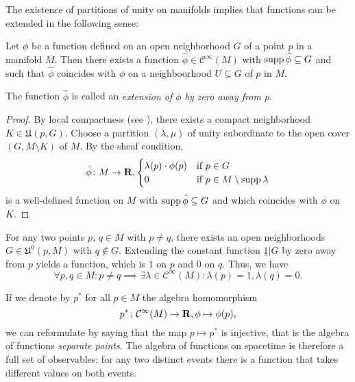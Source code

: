 The existence of partitions of unity on manifolds implies that functions can
be extended in the following sense:

\begin{cor}
  Let $\phi$ be a function defined on an open
  neighborhood $G$ of a point $p$
  in a manifold $M$. Then there exists a function $\widehat \phi \in \mathcal C^\infty(M)$
  with $\operatorname{supp} \widehat\phi \subseteq G$ and
  such that $\widehat \phi$ coincides with $\phi$ on a neighboorhood $U \subseteq G$
  of $p$ in $M$.
\end{cor}
The function $\widehat \phi$ is called an \emph{extension of $\phi$
by zero away from $p$}.

\begin{proof}
  By local compactness (see ),
  there exists a compact neighborhood $K \in \mathfrak U(p, G)$.
  Choose a partition $(\lambda, \mu)$ of unity subordinate to the open cover
  $(G, M \setminus K)$ of $M$. By the sheaf condition,
  \[
    \hat\phi\colon M \to \mathbf{R},
    \begin{cases}
      \lambda(p) \cdot \phi(p) & \text{if $p \in G$} \\
      0 & \text{if $p \in M \setminus \operatorname{supp} \lambda$}
    \end{cases}
  \]
  is a well-defined function on $M$ with $\operatorname{supp} \hat\phi \subseteq G$ and
  which coincides with $\phi$ on $K$.
\end{proof}

For any two points $p$, $q \in M$ with $p \neq q$, there exists an open
neighborhoods $G \in \mathfrak U^0(p, M)$ with $q \notin G$. Extending the
constant function $\underline 1|G$ by zero away from $p$ yields a function,
which is $1$ on $p$ and $0$ on $q$. Thus, we have
\begin{equation}
  \label{eq:point_separation}
  \forall p, q \in M : p \neq q \implies
  \exists \lambda \in \mathcal C^\infty(M) : \lambda(p) = 1, \lambda(q) = 0.
\end{equation}

If we denote by $p^*$ for all $p \in M$ the algebra homomorphism
\begin{equation}
  p^*\colon \mathcal C^\infty(M) \to \mathbf{R}, \phi \mapsto \phi(p),
\end{equation}
we can reformulate  by saying that the map $p \mapsto p^*$ is injective,
that is the algebra of functions \emph{separate points}. The algebra of functions
on spacetime is therefore a full set of observables: for any two distinct events
there is a function that takes different values on both events.

